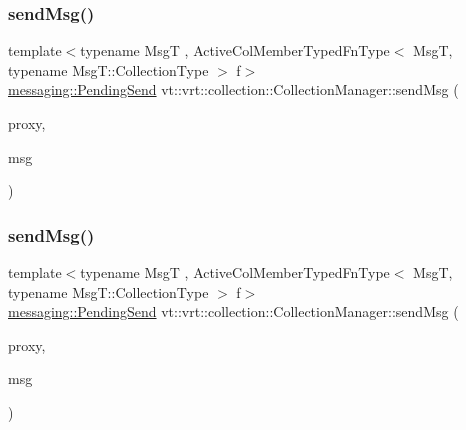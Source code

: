 \subsubsection{\texorpdfstring{send\+Msg()}{sendMsg()}\hspace{0.1cm}{\footnotesize\ttfamily [1/6]}}
{\footnotesize\ttfamily template$<$typename MsgT , Active\+Col\+Member\+Typed\+Fn\+Type$<$ Msg\+T, typename Msg\+T\+::\+Collection\+Type $>$ f$>$ \\
\hyperlink{structvt_1_1messaging_1_1_pending_send}{messaging\+::\+Pending\+Send} vt\+::vrt\+::collection\+::\+Collection\+Manager\+::send\+Msg (\begin{DoxyParamCaption}\item[{\hyperlink{namespacevt_1_1vrt_a620a5c8c59d13e513f690c74b4af516f}{Virtual\+Elm\+Proxy\+Type}$<$ typename Msg\+T\+::\+Collection\+Type $>$ const \&}]{proxy,  }\item[{MsgT $\ast$}]{msg }\end{DoxyParamCaption})}

\mbox{\label{structvt_1_1vrt_1_1collection_1_1_collection_manager_a3165b258fab15c35985b3f9b8ef0dbe7}} 
\subsubsection{\texorpdfstring{send\+Msg()}{sendMsg()}\hspace{0.1cm}{\footnotesize\ttfamily [2/6]}}
{\footnotesize\ttfamily template$<$typename MsgT , Active\+Col\+Member\+Typed\+Fn\+Type$<$ Msg\+T, typename Msg\+T\+::\+Collection\+Type $>$ f$>$ \\
\hyperlink{structvt_1_1messaging_1_1_pending_send}{messaging\+::\+Pending\+Send} vt\+::vrt\+::collection\+::\+Collection\+Manager\+::send\+Msg (\begin{DoxyParamCaption}\item[{\hyperlink{namespacevt_1_1vrt_a620a5c8c59d13e513f690c74b4af516f}{Virtual\+Elm\+Proxy\+Type}$<$ typename Msg\+T\+::\+Collection\+Type $>$ const \&}]{proxy,  }\item[{MsgT $\ast$}]{msg }\end{DoxyParamCaption})}

